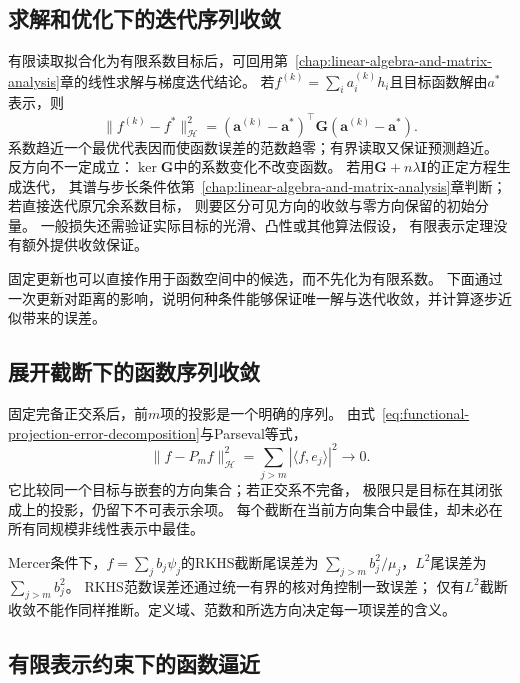 \subsection{求解和优化下的迭代序列收敛}
\label{sec:functional-iteration-convergence}

有限读取拟合化为有限系数目标后，可回用第~\ref{chap:linear-algebra-and-matrix-analysis}章的线性求解与梯度迭代结论。
若$f^{(k)}=\sum_i a_i^{(k)}h_i$且目标函数解由$a^*$表示，则
\[
 \lVert f^{(k)}-f^*\rVert_{\mathcal H}^2
 =(\bm a^{(k)}-\bm a^*)^\top\bm G(\bm a^{(k)}-\bm a^*).
\]
系数趋近一个最优代表因而使函数误差的范数趋零；有界读取又保证预测趋近。
反方向不一定成立：$\ker\bm G$中的系数变化不改变函数。
若用$\bm G+n\lambda\bm I$的正定方程生成迭代，
其谱与步长条件依第~\ref{chap:linear-algebra-and-matrix-analysis}章判断；若直接迭代原冗余系数目标，
则要区分可见方向的收敛与零方向保留的初始分量。
一般损失还需验证实际目标的光滑、凸性或其他算法假设，
有限表示定理没有额外提供收敛保证。

固定更新也可以直接作用于函数空间中的候选，而不先化为有限系数。
下面通过一次更新对距离的影响，说明何种条件能够保证唯一解与迭代收敛，并计算逐步近似带来的误差。



\subsection{展开截断下的函数序列收敛}
\label{sec:functional-truncation-convergence}

固定完备正交系后，前$m$项的投影是一个明确的序列。
由式~\eqref{eq:functional-projection-error-decomposition}与Parseval等式，
\[
 \lVert f-P_mf\rVert_{\mathcal H}^2
 =\sum_{j>m}|\langle f,e_j\rangle|^2\to0.
\]
它比较同一个目标与嵌套的方向集合；若正交系不完备，
极限只是目标在其闭张成上的投影，仍留下不可表示余项。
每个截断在当前方向集合中最佳，却未必在所有同规模非线性表示中最佳。

Mercer条件下，$f=\sum_j b_j\psi_j$的RKHS截断尾误差为
$\sum_{j>m}b_j^2/\mu_j$，$L^2$尾误差为$\sum_{j>m}b_j^2$。
RKHS范数误差还通过统一有界的核对角控制一致误差；
仅有$L^2$截断收敛不能作同样推断。定义域、范数和所选方向决定每一项误差的含义。

\subsection{有限表示约束下的函数逼近}
\label{sec:functional-approximation-capacity-representation}

